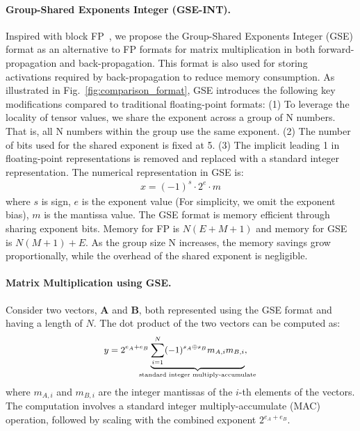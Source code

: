 


\paragraph{Group-Shared Exponents Integer (GSE-INT).} 

Inspired with block FP~\cite{zhang2022fast}, we propose the Group-Shared Exponents Integer (GSE) format as an alternative to FP formats for matrix multiplication in both forward-propagation and back-propagation. 
This format is also used for storing activations required by back-propagation to reduce memory consumption. 
As illustrated in Fig.~\ref{fig:comparison_format}, GSE introduces the following key modifications compared to traditional floating-point formats:
(1) To leverage the locality of tensor values, we share the exponent across a group of N numbers. That is, all N numbers within the group use the same exponent.
(2) The number of bits used for the shared exponent is fixed at 5.
(3) The implicit leading 1 in floating-point representations is removed and replaced with a standard integer representation.
The numerical representation in GSE is:
\begin{equation*}
\begin{aligned}
    x = (-1)^{s} \cdot 2^{e} \cdot m
\end{aligned}
\end{equation*}
where $s$ is sign, $e$ is the exponent value (For simplicity, we omit the exponent bias), $m$ is the mantissa value.
The GSE format is memory efficient through sharing exponent bits. Memory for FP is $N(E+M+1)$ and memory for GSE is $N(M+1)+E$. As the group size N increases, the memory savings grow proportionally, while the overhead of the shared exponent is negligible.




\paragraph{Matrix Multiplication using GSE.}

Consider two vectors, \( \mathbf{A} \) and \( \mathbf{B} \), both represented using the GSE format and having a length of \( N \). The dot product of the two vectors can be computed as:
\begin{equation*}
\small
\begin{aligned}
y &= 2^{e_A + e_B} \underbrace{\sum_{i=1}^N (-1)^{s_A \oplus s_B} m_{A,i} m_{B,i}}_{\mathclap{\text{standard integer multiply-accumulate}}},
\label{eq:GSE_dotprod}
\end{aligned}
\end{equation*}
% 
where \( m_{A,i} \) and \( m_{B,i} \) are the integer mantissas of the \( i \)-th elements of the vectors. The computation involves a standard integer multiply-accumulate (MAC) operation, followed by scaling with the combined exponent \( 2^{e_A + e_B} \).

